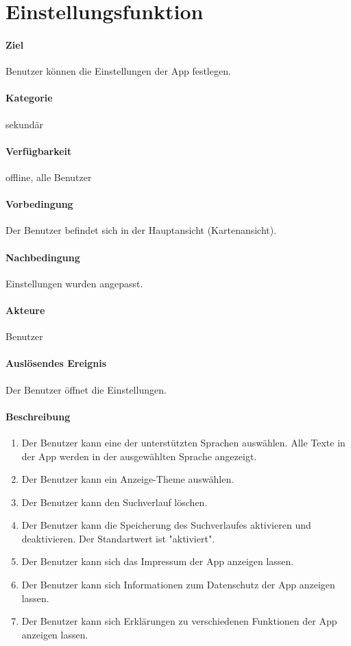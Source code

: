 \section{Einstellungsfunktion}
\paragraph{Ziel}
Benutzer können die Einstellungen der App festlegen.
\paragraph{Kategorie}
sekundär
\paragraph{Verfügbarkeit}
offline, alle Benutzer
\paragraph{Vorbedingung}
Der Benutzer befindet sich in der Hauptansicht (Kartenansicht).
\paragraph{Nachbedingung}
Einstellungen wurden angepasst.
\paragraph{Akteure}
Benutzer
\paragraph{Auslösendes Ereignis}
Der Benutzer öffnet die Einstellungen.
\paragraph{Beschreibung}
\begin{enumerate}
    \item Der Benutzer kann eine der unterstützten Sprachen auswählen. Alle Texte in der App werden in der ausgewählten Sprache angezeigt.
    \item Der Benutzer kann ein Anzeige-Theme auswählen.
    \item Der Benutzer kann den Suchverlauf löschen.
    \item Der Benutzer kann die Speicherung des Suchverlaufes aktivieren und deaktivieren. Der Standartwert ist "aktiviert".
    \item Der Benutzer kann sich das Impressum der App anzeigen lassen.
    \item Der Benutzer kann sich Informationen zum Datenschutz der App anzeigen lassen.
    \item Der Benutzer kann sich Erklärungen zu verschiedenen Funktionen der App anzeigen lassen.
\end{enumerate}